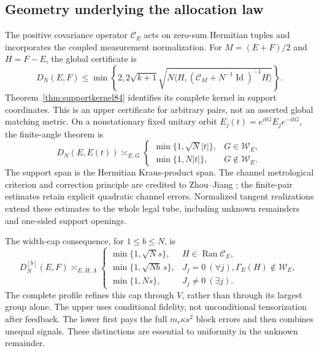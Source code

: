 \subsection{Geometry underlying the allocation law}
The positive covariance operator $\mathcal C_E$ acts on zero-sum
Hermitian tuples and incorporates the coupled measurement normalization.
For $M=(E+F)/2$ and $H=F-E$, the global certificate is
\begin{equation}\label{eq:frontupper84}
 D_N(E,F)\le\min\left\{2,2\sqrt{k+1}
 \sqrt{N\langle H,(\mathcal C_M+N^{-1}\operatorname{Id})^{-1}H\rangle}
 \right\}.
\end{equation}
Theorem~\ref{thm:supportkernel84} identifies its complete kernel in
support coordinates.  This is an upper certificate for arbitrary
pairs, not an asserted global matching metric.  On a nonstationary
fixed unitary orbit $E_j(t)=e^{itG}E_je^{-itG}$, the finite-angle theorem is
\begin{equation}\label{eq:frontorbit84}
 D_N(E,E(t))\asymp_{E,G}
 \begin{cases}
 \min\{1,\sqrt N|t|\},&G\in\mathcal W_E,\\
 \min\{1,N|t|\},&G\notin\mathcal W_E.
 \end{cases}
\end{equation}
The support span is the Hermitian Kraus-product span.  The channel
metrological criterion and correction principle are credited to
Zhou--Jiang \cite{ZJ84}; the finite-pair estimates retain explicit
quadratic channel errors.  Normalized tangent realizations extend
these estimates to the whole legal tube, including unknown remainders
and one-sided support openings.

The width-cap consequence, for $1\le b\le N$, is
\begin{equation}\label{eq:frontwidth87}
 D_N^{[b]}(E,F)\asymp_{E,H,\Lambda}
 \begin{cases}
 \min\{1,\sqrt Ns\},&H\in\operatorname{Ran}\mathcal C_E,\\
 \min\{1,\sqrt{Nb}\,s\},&J_j=0\ (\forall j),
                          \Gamma_E(H)\notin\mathcal W_E,\\
 \min\{1,Ns\},&J_j\ne0\ (\exists j).
 \end{cases}
\end{equation}
The complete profile refines this cap through $V$, rather than through
its largest group alone.  The upper uses conditional fidelity, not
unconditional tensorization after feedback.  The lower first pays the
full $m_r\kappa s^2$ block errors and then combines unequal signals.
These distinctions are essential to uniformity in the unknown remainder.

